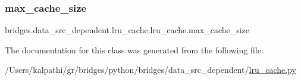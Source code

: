 \subsubsection{\texorpdfstring{max\_cache\_size}{max\_cache\_size}}
{\footnotesize\ttfamily bridges.\+data\+\_\+src\+\_\+dependent.\+lru\+\_\+cache.\+lru\+\_\+cache.\+max\+\_\+cache\+\_\+size}



The documentation for this class was generated from the following file\+:\begin{DoxyCompactItemize}
\item 
/\+Users/kalpathi/gr/bridges/python/bridges/data\+\_\+src\+\_\+dependent/\mbox{\hyperlink{lru__cache_8py}{lru\+\_\+cache.\+py}}\end{DoxyCompactItemize}
